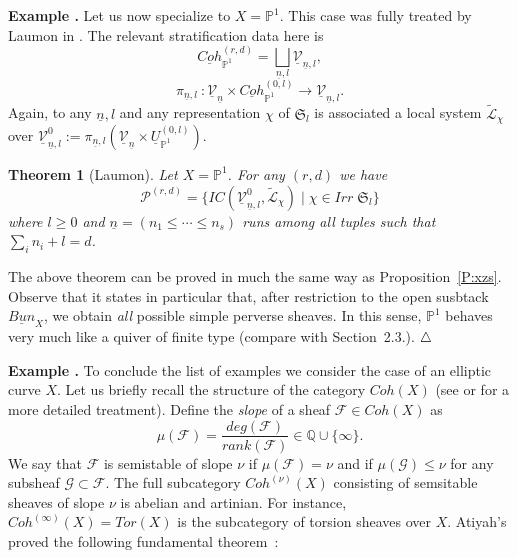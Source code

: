 \documentclass[a4paper,10pt]{amsart}
\def\endexample{$\hfill \triangle$}
\def\endexample{$\hfill \triangle$}
\newtheorem{theo}{\bf{Theorem}}[section]
\numberwithin{equation}{section}
\begin{document}
\vspace{.2in}

\addtocounter{theo}{1}
\noindent \textbf{Example \thetheo .} Let us now specialize to $X=\mathbb{P}^1$. This case was fully treated by Laumon in \cite{Laumon}. The relevant stratification data here is
$$\underline{Coh}_{\mathbb{P}^1}^{(r,d)}=\bigsqcup_{\underline{n},l} \underline{\mathcal{V}}_{\underline{n},l},$$
$$\pi_{\underline{n},l}~: \underline{\mathcal{V}}_{\underline{n}} \times \underline{Coh}^{(0,l)}_{\mathbb{P}^1} \to \underline{\mathcal{V}}_{\underline{n},l}.$$
Again, to any $\underline{n},l$ and any representation $\chi$ of $\mathfrak{S}_{l}$ is associated a local system $\widetilde{\mathcal{L}}_{\chi}$ over $\underline{\mathcal{V}}^0_{\underline{n},l}:=\pi_{\underline{n},l}(\underline{\mathcal{V}}_{\underline{n}} \times \underline{U}^{(0,l)}_{\mathbb{P}^1} )$.

\vspace{.1in}

\begin{theo}[Laumon] Let $X=\mathbb{P}^1$. For any $(r,d)$ we have
$$\mathcal{P}^{(r,d)}=\big\{ IC(\underline{\mathcal{V}}^0_{\underline{n},l}, \widetilde{\mathcal{L}}_{\chi})\;|\; \chi \in Irr\;\mathfrak{S}_l\}$$
where $l \geq 0$ and $\underline{n}=(n_1 \leq \cdots \leq n_s)$ runs among all tuples such that
$\sum_i n_i+l=d$.
\end{theo}

The above theorem can be proved in much the same way as Proposition~\ref{P:xzs}. Observe that it states in particular that, after restriction to the open susbtack $\underline{Bun}_X$, we obtain \textit{all} possible simple perverse sheaves. In this sense, $\mathbb{P}^1$ behaves very much like a quiver of finite type (compare with Section~2.3.).
\endexample

\vspace{.2in}

\addtocounter{theo}{1}
\noindent \textbf{Example \thetheo .} To conclude the list of examples we consider the case of an elliptic curve $X$. Let us briefly recall the structure of the category $Coh(X)$ (see \cite{Atiyah} or \cite{Scano} for a more detailed treatment). Define the \textit{slope} of a sheaf $\mathcal{F} \in Coh(X)$ as
$$\mu(\mathcal{F})=\frac{deg(\mathcal{F})}{rank(\mathcal{F})} \in \mathbb{Q} \cup \{\infty\}.$$
We say that $\mathcal{F}$ is semistable of slope $\nu$ if $\mu(\mathcal{F})=\nu$ and if $\mu(\mathcal{G}) \leq \nu$ for any subsheaf $\mathcal{G} \subset \mathcal{F}$. The full subcategory $Coh^{(\nu)}(X)$ consisting of semsitable sheaves of slope $\nu$ is abelian and artinian. For instance, $Coh^{(\infty)}(X) = Tor(X)$ is the subcategory of torsion sheaves over $X$. Atiyah's proved the following fundamental theorem~:
\end{document}
